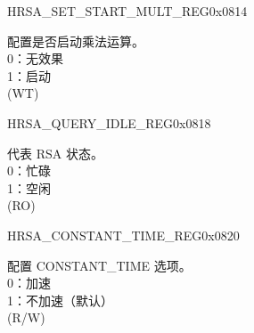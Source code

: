 \begin{register}{H}{RSA\_SET\_START\_MULT\_REG}{0x0814}\label{regdesc:RSASETSTARTMULTREG}
%
%
\regnewline%
\begin{regdesc}\begin{reglist}
\label{fielddesc:RSASETSTARTMULT}\item [RSA\_SET\_START\_MULT] 配置是否启动乘法运算。\\
0：无效果\\
1：启动\\
(WT)
\end{reglist}\end{regdesc}
\end{register}


\begin{register}{H}{RSA\_QUERY\_IDLE\_REG}{0x0818}\label{regdesc:RSAQUERYIDLEREG}
%
%
\regnewline%
\begin{regdesc}\begin{reglist}
\label{fielddesc:RSAQUERYIDLE}\item [RSA\_QUERY\_IDLE] 代表 RSA 状态。\\
0：忙碌\\
1：空闲\\
(RO)
\end{reglist}\end{regdesc}
\end{register}


\begin{register}{H}{RSA\_CONSTANT\_TIME\_REG}{0x0820}\label{regdesc:RSACONSTANTTIMEREG}
%
%
\regnewline%
\begin{regdesc}\begin{reglist}
\label{fielddesc:RSACONSTANTTIME}\item [RSA\_CONSTANT\_TIME] 配置 CONSTANT\_TIME 选项。\\
0：加速\\
1：不加速（默认）\\
(R/W)
\end{reglist}\end{regdesc}
\end{register}


